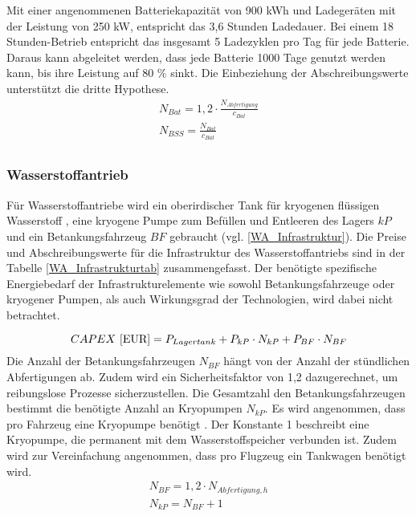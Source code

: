 Mit einer angenommenen Batteriekapazität von 900 kWh und Ladegeräten 
mit der Leistung von 250 kW, entspricht das 3,6 Stunden Ladedauer.
Bei einem 18 Stunden-Betrieb entspricht das insgesamt 5 Ladezyklen pro Tag für jede Batterie. %
Daraus kann abgeleitet werden, dass jede Batterie 1000 Tage genutzt werden kann,
bis ihre Leistung auf 80 \% sinkt.
Die Einbeziehung der Abschreibungswerte unterstützt die dritte Hypothese.
%
\begin{equation}
   \begin{split}
  {N_{Bat}} = {1,2} \cdot \frac{N_{Abfertigung}}{c_{Bat}}\\
   {N_{BSS}} = \frac{N_{Bat}}{c_{Bat}}\\
   \label{BatInfrAnzahl}
    \end{split}
   \end{equation}
%
\subsubsection{Wasserstoffantrieb}
%

Für Wasserstoffantriebe wird ein oberirdischer Tank für kryogenen flüssigen Wasserstoff , 
eine kryogene Pumpe zum Befüllen und Entleeren des Lagers ${kP}$ 
und ein Betankungsfahrzeug ${BF}$ gebraucht (vgl. \eqref{WA_Infrastruktur}). 
Die Preise und Abschreibungswerte für die Infrastruktur des Wasserstoffantriebs 
sind in der Tabelle \ref{WA_Infrastrukturtab} zusammengefasst. 
%
Der benötigte spezifische Energiebedarf der Infrastrukturelemente wie sowohl Betankungsfahrzeuge 
oder kryogener Pumpen, als auch Wirkungsgrad der Technologien, wird dabei nicht betrachtet.

\begin{equation}
   {CAPEX ~[\text{EUR}]} = {P_{Lagertank}} + P_{kP} \cdot N_{kP} + P_{BF} \cdot N_{BF}  \\
   \label{WA_Infrastruktur}
\end{equation}
%
Die Anzahl der Betankungsfahrzeugen $N_{BF}$ hängt von der Anzahl der stündlichen Abfertigungen ab. 
Zudem wird ein Sicherheitsfaktor
von 1,2 dazugerechnet, um reibungslose Prozesse sicherzustellen.
Die Gesamtzahl den Betankungsfahrzeugen bestimmt die benötigte Anzahl an Kryopumpen $N_{kP}$. 
Es wird angenommen, dass pro Fahrzeug eine Kryopumpe benötigt \cite{hoelzen2022h2}.
Der Konstante 1 beschreibt eine Kryopumpe,
die permanent mit dem Wasserstoffspeicher verbunden ist.
Zudem wird zur Vereinfachung angenommen, dass pro Flugzeug ein Tankwagen benötigt wird.
\begin{equation}
   \begin{split}
   {N_{BF}} = {1,2} \cdot {N_{Abfertigung,h}}\\
   {N_{kP}} = N_{BF} + 1 \\
   \label{WAInfrAnzahl}
   \end{split}
   \end{equation}

